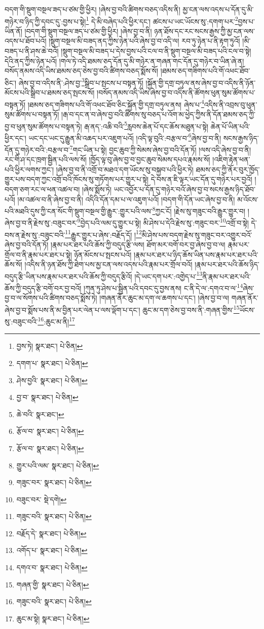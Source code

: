 བདག་གི་སྡུག་བསྔལ་ཟད་པ་ཙམ་གྱི་ཕྱིར། །ཞེས་བྱ་བའི་ཚིགས་བཅད་འདིས་ནི། མྱ་ངན་ལས་འདས་པ་དོན་དུ་མི་གཉེར་བ་ཉིད་ཀྱི་དབང་དུ་:བྱས་པ་སྟེ།\footnote{བྱས་ཏེ།  སྣར་ཐང་།  པེ་ཅིན། } དེ་མི་བཞེད་པའི་ཕྱིར་དང་། ཚངས་པ་ཡང་ཡོངས་སུ་:དགག་པར་\footnote{དགག་པ་  སྣར་ཐང་།  པེ་ཅིན། }བྱས་པ་ཡིན་ནོ། །བདག་གི་སྡུག་བསྔལ་ཟད་པ་ཙམ་གྱི་ཕྱིར། །ཞེས་བྱ་བ་ནི། ཉན་ཐོས་དང་རང་སངས་རྒྱས་ཀྱི་མྱ་ངན་ལས་འདས་པ་ཐོབ་པའོ། །སྡུག་བསྔལ་མི་བཟད་ནད་ཀྱིས་ཉེན་པའི་ཞེས་བྱ་བ་འདི་ལ། རབ་ཏུ་ཉེན་པ་ནི་རྟག་ཏུའོ། །མི་བཟད་པ་ནི་ཤས་ཆེ་བའོ། །སྡུག་བསྔལ་མི་བཟད་པ་དེས་བྱས་པའི་ངལ་བ་ནི་སྡུག་བསྔལ་མི་བཟད་པའི་ངལ་བ་སྟེ། དེའི་ནད་ཀྱིས་ཉེན་པའོ། །གལ་ཏེ་འདི་ཐམས་ཅད་དོན་དུ་མི་གཉེར་ན་གཞན་གང་དོན་དུ་གཉེར་བ་ཡིན་ཞེ་ན། བསོད་ནམས་འདི་ཡིས་ཐམས་ཅད་ཅེས་བྱ་བའི་ཚིགས་བཅད་སྨོས་སོ། །ཐམས་ཅད་གཟིགས་པའི་གོ་འཕང་ཐོབ་ཅིང་། ཞེས་བྱ་བ་འདིས་ནི་:ཤེས་བྱ་\footnote{ཤེས་བྱའི་  སྣར་ཐང་།  པེ་ཅིན། }སྒྲིབ་པ་སྤངས་པ་བསྟན་ཏོ། །སྐྱོན་གྱི་དགྲ་བཏུལ་ནས་ཞེས་བྱ་བ་འདིས་ནི་ཉོན་མོངས་པའི་སྒྲིབ་པ་ཐམས་ཅད་སྤངས་སོ། །བསོད་ནམས་འདི་ཡིས་ཞེས་བྱ་བ་འདིས་ནི་ཚོགས་ཕུན་སུམ་ཚོགས་པ་བསྟན་ཏོ། །ཐམས་ཅད་གཟིགས་པའི་གོ་འཕང་ཐོབ་ཅིང་སྐྱོན་གྱི་དགྲ་བཏུལ་ནས། ཞེས་པ་\footnote{བྱ་བ་  སྣར་ཐང་།  པེ་ཅིན། }འདིས་ནི་འབྲས་བུ་ཕུན་སུམ་ཚོགས་པ་བསྟན་ཏོ། །རྒ་བ་དང་ན་བ་ཞེས་བྱ་བའི་ཚིགས་སུ་བཅད་པ་འོག་མ་ཕྱེད་ཀྱིས་ནི་དོན་ཐམས་ཅད་ཀྱི་བྱ་བ་ཕུན་སུམ་ཚོགས་པ་བསྟན་ཏེ། རྒ་ནད་:འཆི་བའི་\footnote{ཆེ་བའི་  སྣར་ཐང་། }རླབས་ཆེན་པོ་དང་ཆོས་མཐུན་པ་སྟེ། ཆེན་པོ་ཡིན་པའི་ཕྱིར་དང་། ཡང་དང་ཡང་དུ་རྒྱུན་མི་འཆད་པར་འཇུག་པའོ། །འདི་ལྟ་བུའི་:བརྩལ་བ་\footnote{རྩོལ་བ་  སྣར་ཐང་།  པེ་ཅིན། }ཞེས་བྱ་བ་ནི། སངས་རྒྱས་ཉིད་དོན་དུ་གཉེར་བའི་:བརྩལ་བ་\footnote{རྩོལ་བ་  སྣར་ཐང་།  པེ་ཅིན། }གང་ཡིན་པ་སྟེ། བྱང་ཆུབ་ཀྱི་སེམས་ཞེས་བྱ་བའི་དོན་ཏོ། །ལས་འདི་ཞེས་བྱ་བ་ནི། རང་གི་ཤ་དང་ཁྲག་སྦྱིན་པའི་ལས་སོ། །ཁྱོད་ལྟ་བུ་ཞེས་བྱ་བ་བྱང་ཆུབ་སེམས་དཔའ་རྣམས་སོ། །འཇིག་རྟེན་ཕན་པའི་ཕྱིར་ལགས་ཀྱང་། །ཞེས་བྱ་བ་ནི་འགྲོ་བ་མཐའ་དག་ཡོངས་སུ་བསྐྱབ་པའི་ཕྱིར་ཏེ། ཐམས་ཅད་ཀྱི་ནོར་བུར་ཁྱོད་གྱུར་པས་བདག་ཀྱང་འགྲོ་བའི་ཁོངས་སུ་གཏོགས་པར་གྱུར་པ་སྟེ། དེ་བས་ན་ཇི་ལྟར་ཡང་དོན་དུ་གཉེར་པར་བྱའོ། །བདག་ཅག་རང་ལ་ཕན་འཚལ་བ། །ཞེས་སྨོས་ཏེ། ཡང་འབྱོར་པ་དོན་དུ་གཉེར་བའོ་ཞེས་བྱ་བ་སངས་རྒྱས་ཉིད་ཐོབ་པའོ། །མ་འཚལ་བ་ནི་ཞེས་བྱ་བ་ནི། འདིའི་དོན་དམ་པ་ལ་འཇུག་པའོ། །བདག་གི་དོན་ཡང་ཞེས་བྱ་བ་ནི། མ་འོངས་པའི་མཐའི་དུས་ཀྱི་ངན་སོང་གི་སྡུག་བསྔལ་གྱི་རྒྱུར་:གྱུར་པའི་ལས་\footnote{གྱུར་པའི་ལམ་  སྣར་ཐང་།  པེ་ཅིན། }ཀྱང་ངོ། །རྗེས་སུ་གཟུང་བའི་རྒྱུར་གྱུར་བ། །ཞེས་བྱ་བ་ནི་རྗེས་སུ་:བཟུང་བར་\footnote{གཟུང་བར་  སྣར་ཐང་།  པེ་ཅིན། }བྱེད་པའི་ལམ་དུ་གྱུར་པ་སྟེ། མི་ཤེས་པ་དེའི་རྗེས་སུ་:གཟུང་བར་\footnote{བཟུང་བར་  སྡེ་དགེ། }འགྲོ་བ་སྟེ། དེ་བས་ན་རྗེས་སུ་:བཟུང་བའི་\footnote{གཟུང་བའི་  སྣར་ཐང་།  པེ་ཅིན། }རྒྱུར་གྱུར་པ་ཞེས་:བརྗོད་དོ། །\footnote{བརྗོད་དེ་  སྣར་ཐང་།  པེ་ཅིན། }མི་ཤེས་པས་བདག་རྗེས་སུ་གཟུང་བར་འགྱུར་བའོ་ཞེས་བྱ་བའི་དོན་ཏོ། །རྣམ་པར་ཐར་པའི་ཆོས་ཀྱི་བདུད་རྩི་ལས། ཐོག་མར་བགོ་བར་བྱ་ཞེས་བྱ་བ་ལ། རྣམ་པར་གྲོལ་བ་ནི་རྣམ་པར་ཐར་པ་སྟེ། ཉོན་མོངས་པ་སྤངས་པའོ། །རྣམ་པར་ཐར་པ་ཉིད་ཆོས་ཡིན་པས་རྣམ་པར་ཐར་པའི་ཆོས་སོ། །འདིས་ནི་ཉན་ཐོས་ཀྱི་ཐེག་པས་མྱ་ངན་ལས་འདས་པའི་རྣམ་པར་གྲོལ་བའོ། །རྣམ་པར་ཐར་པའི་ཆོས་ཉིད་བདུད་རྩི་ཡིན་པས་རྣམ་པར་ཐར་པའི་ཆོས་ཀྱི་བདུད་རྩིའོ། །དེ་ཡང་དག་པར་:འགྱེད་པ་\footnote{འགོད་པ་  སྣར་ཐང་།  པེ་ཅིན། }ནི་རྣམ་པར་ཐར་པའི་ཆོས་ཀྱི་བདུད་རྩི་བགོ་བར་བྱ་བའོ། །ཀུན་ཏུ་ཤེས་པ་སྦྱིན་པའི་དབང་དུ་བྱས་ནས། ང་ནི་དེ་ལ་:དགའ་བ་ལ་\footnote{དགའ་བ་  སྣར་ཐང་།  པེ་ཅིན། }ཞེས་བྱ་བ་ལ་སོགས་པའི་ཚིགས་བཅད་སྨོས་ཏེ། །གཞན་ནོར་ཆུང་མ་དག་ལ་ཆགས་པ་དང་། །ཞེས་བྱ་བ་ལ། གཞན་ནོར་ཞེས་བྱ་བ་སྨོས་པས་ནི་མ་བྱིན་པར་ལེན་པ་ལས་ལྡོག་པ་དང་། ཆུང་མ་དག་ཅེས་བྱ་བས་ནི་:གཞན་གྱིས་\footnote{གཞན་གྱི་  སྣར་ཐང་།  པེ་ཅིན། }ཡོངས་སུ་:བཟུང་བའི་\footnote{གཟུང་བའི་  སྣར་ཐང་།  པེ་ཅིན། }:ཆུང་མ་ནི།\footnote{ཆུང་མ་སྟེ།  སྣར་ཐང་།  པེ་ཅིན། } 